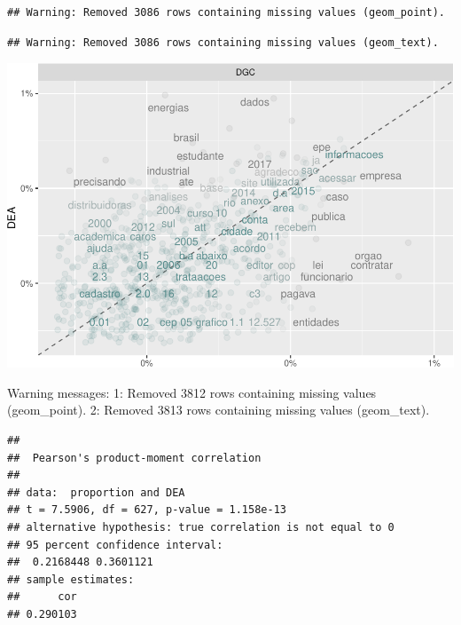 \documentclass[]{article}
\newenvironment{Shaded}{\begin{snugshade}}{\end{snugshade}}
\newcommand{\KeywordTok}[1]{\textcolor[rgb]{0.13,0.29,0.53}{\textbf{#1}}}
\newcommand{\DataTypeTok}[1]{\textcolor[rgb]{0.13,0.29,0.53}{#1}}
\newcommand{\StringTok}[1]{\textcolor[rgb]{0.31,0.60,0.02}{#1}}
\newcommand{\FunctionTok}[1]{\textcolor[rgb]{0.00,0.00,0.00}{#1}}
\newcommand{\OperatorTok}[1]{\textcolor[rgb]{0.81,0.36,0.00}{\textbf{#1}}}
\newcommand{\AttributeTok}[1]{\textcolor[rgb]{0.77,0.63,0.00}{#1}}
\newcommand{\NormalTok}[1]{#1}
\begin{document}
\begin{verbatim}
## Warning: Removed 3086 rows containing missing values (geom_point).
\end{verbatim}

\begin{verbatim}
## Warning: Removed 3086 rows containing missing values (geom_text).
\end{verbatim}

\includegraphics{markdown_v30_files/figure-latex/unnamed-chunk-63-1.pdf}

\begin{Shaded}
\begin{Highlighting}[]
\FunctionTok{Warning messages:}
\FunctionTok{1:}\AttributeTok{ Removed 3812 rows containing missing values (geom_point). }
\FunctionTok{2:}\AttributeTok{ Removed 3813 rows containing missing values (geom_text).}
\end{Highlighting}
\end{Shaded}

\begin{Shaded}
\end{Shaded}

\begin{verbatim}
## 
##  Pearson's product-moment correlation
## 
## data:  proportion and DEA
## t = 7.5906, df = 627, p-value = 1.158e-13
## alternative hypothesis: true correlation is not equal to 0
## 95 percent confidence interval:
##  0.2168448 0.3601121
## sample estimates:
##      cor 
## 0.290103
\end{verbatim}
\end{document}
